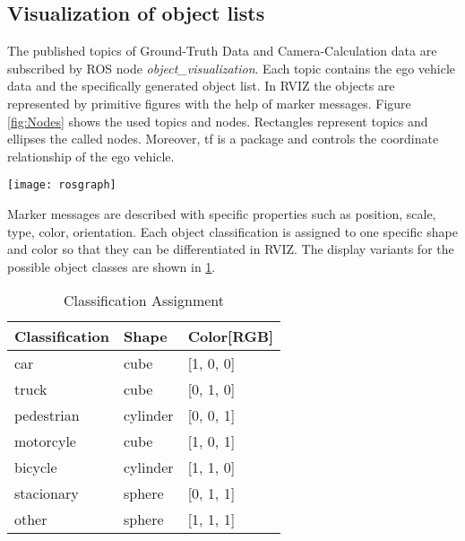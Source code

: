 \subsection{Visualization of object lists}

The published topics of Ground-Truth Data and Camera-Calculation data are subscribed by \ac{ROS} node \textit{object\_visualization}. Each topic contains the ego vehicle data and the specifically generated object list. In \ac{RVIZ} the objects are represented by primitive figures with the help of marker messages. Figure \ref{fig:Nodes} shows the used topics and nodes. Rectangles represent topics and ellipses the called nodes. Moreover, tf is a package and controls the coordinate relationship of the ego vehicle.

\begin{figure*}[thpb]
	\centering
	\texttt{[image: rosgraph]}
	\caption{Nodes / Topics in \ac{ROS}}
	\label{fig:Nodes}
\end{figure*}
Marker messages are described with specific properties such as position, scale, type, color, orientation. Each object classification is assigned to one specific shape and color so that they can be differentiated in \ac{RVIZ}. The display variants for the possible object classes are shown in \cref{ClassificationAssignment}. 
\begin{table}[h]
	\caption{Classification Assignment}
	\begin{tabularx}{\columnwidth}{XXX}
		\toprule
		Classification & Shape & Color[RGB]\\
		\toprule
		car & cube & [1, 0, 0]\\
		truck & cube & [0, 1, 0]\\
		pedestrian & cylinder & [0, 0, 1]\\
		motorcyle & cube & [1, 0, 1]\\
		bicycle & cylinder & [1, 1, 0]\\
		stacionary & sphere & [0, 1, 1]\\
		other & sphere & [1, 1, 1]\\
		\bottomrule
	\end{tabularx}
	\label{ClassificationAssignment}
\end{table}

